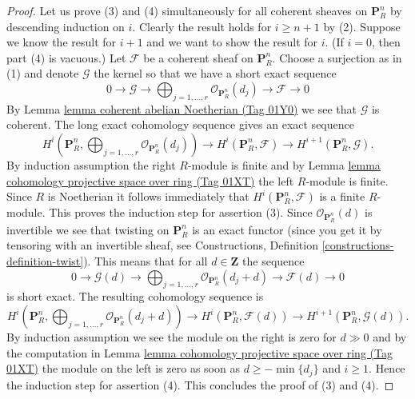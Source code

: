 \documentclass{amsart}
\theoremstyle{plain}
\theoremstyle{definition}
\theoremstyle{remark}
\numberwithin{equation}{subsection}
\begin{document}
\begin{proof}
\medskip\noindent
Let us prove (3) and (4) simultaneously for all coherent sheaves
on $\mathbf{P}^n_R$ by descending induction on $i$. Clearly the result
holds for $i \geq n + 1$ by (2). Suppose we know the result for
$i + 1$ and we want to show the result for $i$. (If $i = 0$, then
part (4) is vacuous.) Let $\mathcal{F}$ be a coherent sheaf on
$\mathbf{P}^n_R$. Choose a surjection as in (1) and denote
$\mathcal{G}$ the kernel so that we have a short exact sequence
$$
0 \to \mathcal{G} \to
\bigoplus\nolimits_{j = 1, \ldots, r}
\mathcal{O}_{\mathbf{P}^n_R}(d_j)
\to
\mathcal{F} \to 0
$$
By Lemma \href{https://stacks.math.columbia.edu/tag/01Y0}{lemma coherent abelian Noetherian (Tag 01Y0)}
we see that $\mathcal{G}$ is coherent. The long exact
cohomology sequence gives an exact sequence
$$
H^i(\mathbf{P}^n_R, \bigoplus\nolimits_{j = 1, \ldots, r}
\mathcal{O}_{\mathbf{P}^n_R}(d_j))
\to
H^i(\mathbf{P}^n_R, \mathcal{F})
\to
H^{i + 1}(\mathbf{P}^n_R, \mathcal{G}).
$$
By induction assumption the right $R$-module is finite and by
Lemma \href{https://stacks.math.columbia.edu/tag/01XT}{lemma cohomology projective space over ring (Tag 01XT)} the left
$R$-module is finite. Since $R$ is Noetherian it follows immediately
that $H^i(\mathbf{P}^n_R, \mathcal{F})$ is a finite $R$-module.
This proves the induction step for assertion (3).
Since $\mathcal{O}_{\mathbf{P}^n_R}(d)$ is invertible
we see that twisting on $\mathbf{P}^n_R$ is an exact functor (since
you get it by tensoring with an invertible sheaf, see
Constructions, Definition \ref{constructions-definition-twist}).
This means that for all $d \in \mathbf{Z}$ the sequence
$$
0 \to \mathcal{G}(d) \to
\bigoplus\nolimits_{j = 1, \ldots, r}
\mathcal{O}_{\mathbf{P}^n_R}(d_j + d)
\to
\mathcal{F}(d) \to 0
$$
is short exact. The resulting cohomology sequence is
$$
H^i(\mathbf{P}^n_R, \bigoplus\nolimits_{j = 1, \ldots, r}
\mathcal{O}_{\mathbf{P}^n_R}(d_j + d))
\to
H^i(\mathbf{P}^n_R, \mathcal{F}(d))
\to
H^{i + 1}(\mathbf{P}^n_R, \mathcal{G}(d)).
$$
By induction assumption we see the module on the right is zero
for $d \gg 0$ and by the computation in
Lemma \href{https://stacks.math.columbia.edu/tag/01XT}{lemma cohomology projective space over ring (Tag 01XT)}
the module on the left is zero as soon as $d \geq -\min\{d_j\}$
and $i \geq 1$. Hence the induction step for assertion (4).
This concludes the proof of (3) and (4).


\end{proof}
\end{document}
